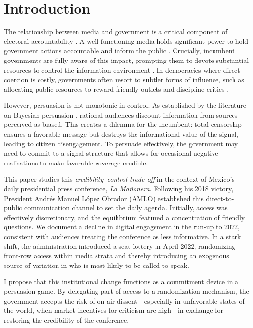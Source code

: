 \section{Introduction}

The relationship between media and government is a critical component of electoral accountability \citep{Audits-Ferraz-QJE, PolInfo-Enriquez-JEEA, Marshall}. A well-functioning media holds significant power to hold government actions accountable and inform the public \citep{Stromberg-MediaCoverage}. Crucially, incumbent governments are fully aware of this impact, prompting them to devote substantial resources to control the information environment \citep{Autocracy-Guriev-JPE}. In democracies where direct coercion is costly, governments often resort to subtler forms of influence, such as allocating public resources to reward friendly outlets and discipline critics \citep{ArgCorr-DiTella-AEJAE, MediaCaptures-Zeidl-Econometrica}.

However, persuasion is not monotonic in control. As established by the literature on Bayesian persuasion \citep{MediaBias-Gentzkow-JPE, PersuasionEmpirical-Dellavigna-AR}, rational audiences discount information from sources perceived as biased. This creates a dilemma for the incumbent: total censorship ensures a favorable message but destroys the informational value of the signal, leading to citizen disengagement. To persuade effectively, the government may need to commit to a signal structure that allows for occasional negative realizations to make favorable coverage credible.

This paper studies this \textit{credibility--control trade-off} in the context of Mexico's daily presidential press conference, \textit{La Mañanera}. Following his 2018 victory, President Andrés Manuel López Obrador (AMLO) established this direct-to-public communication channel to set the daily agenda. Initially, access was effectively discretionary, and the equilibrium featured a concentration of friendly questions. We document a decline in digital engagement in the run-up to 2022, consistent with audiences treating the conference as less informative. In a stark shift, the administration introduced a seat lottery in April 2022, randomizing front-row access within media strata and thereby introducing an exogenous source of variation in who is most likely to be called to speak.

I propose that this institutional change functions as a commitment device in a persuasion game. By delegating part of access to a randomization mechanism, the government accepts the risk of on-air dissent---especially in unfavorable states of the world, when market incentives for criticism are high---in exchange for restoring the credibility of the conference.

